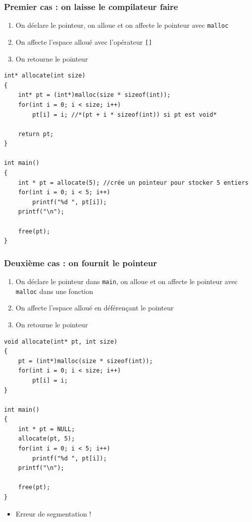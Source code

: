 \begin{frame}[containsverbatim]
\frametitle{Premier cas : on laisse le compilateur faire}
\begin{enumerate}
\item On déclare le pointeur, on alloue et on affecte le pointeur avec \texttt{malloc}
\item On affecte l'espace alloué avec l'opérateur \texttt{[]}
\item On retourne le pointeur
\end{enumerate}
\begin{lstlisting}
int* allocate(int size)
{
	int* pt = (int*)malloc(size * sizeof(int));
	for(int i = 0; i < size; i++)
		pt[i] = i; //*(pt + i * sizeof(int)) si pt est void*

	return pt;
}

int main()
{
	int * pt = allocate(5); //crée un pointeur pour stocker 5 entiers
	for(int i = 0; i < 5; i++)
		printf("%d ", pt[i]);
	printf("\n");

	free(pt);
}
\end{lstlisting}
\end{frame}

\begin{frame}[containsverbatim]
\frametitle{Deuxième cas : on fournit le pointeur}
\begin{enumerate}
\item On déclare le pointeur dans \texttt{main}, on alloue et on affecte le pointeur avec \texttt{malloc} dans une fonction
\item On affecte l'espace alloué en déférençant le pointeur
\item On retourne le pointeur
\end{enumerate}
\begin{lstlisting}
void allocate(int* pt, int size)
{
	pt = (int*)malloc(size * sizeof(int));
	for(int i = 0; i < size; i++)
		pt[i] = i;
}

int main()
{
	int * pt = NULL;
	allocate(pt, 5);
	for(int i = 0; i < 5; i++)
		printf("%d ", pt[i]);
	printf("\n");

	free(pt);
}
\end{lstlisting}
\begin{itemize}
\item Erreur de segmentation !
\end{itemize}
\end{frame}

